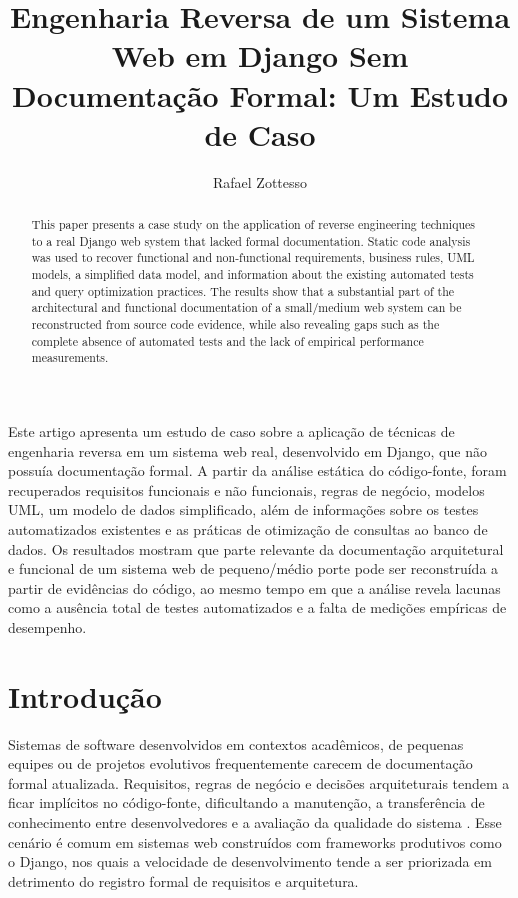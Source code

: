 \documentclass[12pt]{article}
\title{Engenharia Reversa de um Sistema Web em Django Sem Documentação Formal: Um Estudo de Caso}
\author{Rafael Zottesso\inst{1}}
\begin{document}
\maketitle

\begin{abstract}
  This paper presents a case study on the application of reverse engineering
  techniques to a real Django web system that lacked formal documentation.
  Static code analysis was used to recover functional and non-functional
  requirements, business rules, UML models, a simplified data model, and
  information about the existing automated tests and query optimization
  practices. The results show that a substantial part of the architectural
  and functional documentation of a small/medium web system can be
  reconstructed from source code evidence, while also revealing gaps such as
  the complete absence of automated tests and the lack of empirical
  performance measurements.
\end{abstract}

\begin{resumo}
  Este artigo apresenta um estudo de caso sobre a aplicação de técnicas de
  engenharia reversa em um sistema web real, desenvolvido em Django, que não
  possuía documentação formal. A partir da análise estática do código-fonte,
  foram recuperados requisitos funcionais e não funcionais, regras de
  negócio, modelos UML, um modelo de dados simplificado, além de informações
  sobre os testes automatizados existentes e as práticas de otimização de
  consultas ao banco de dados. Os resultados mostram que parte relevante da
  documentação arquitetural e funcional de um sistema web de pequeno/médio
  porte pode ser reconstruída a partir de evidências do código, ao mesmo
  tempo em que a análise revela lacunas como a ausência total de testes
  automatizados e a falta de medições empíricas de desempenho.
\end{resumo}

\section{Introdução}

Sistemas de software desenvolvidos em contextos acadêmicos, de pequenas
equipes ou de projetos evolutivos frequentemente carecem de documentação
formal atualizada. Requisitos, regras de negócio e decisões arquiteturais
tendem a ficar implícitos no código-fonte, dificultando a manutenção, a
transferência de conhecimento entre desenvolvedores e a avaliação da
qualidade do sistema \cite{chikofsky1990,corbi1989}. Esse cenário é comum em
sistemas web construídos com frameworks produtivos como o Django, nos quais a
velocidade de desenvolvimento tende a ser priorizada em detrimento do
registro formal de requisitos e arquitetura.
\end{document}
